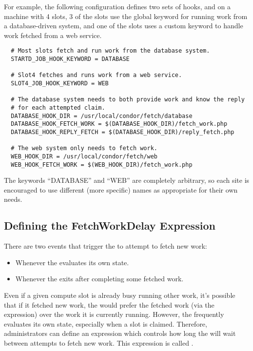 For example, the following configuration defines two sets of hooks,
and on a machine with 4 slots, 3 of the slots use the global keyword
for running work from a database-driven system, and one of the slots
uses a custom keyword to handle work fetched from a web service.
\begin{verbatim}
  # Most slots fetch and run work from the database system.
  STARTD_JOB_HOOK_KEYWORD = DATABASE

  # Slot4 fetches and runs work from a web service.
  SLOT4_JOB_HOOK_KEYWORD = WEB

  # The database system needs to both provide work and know the reply
  # for each attempted claim.
  DATABASE_HOOK_DIR = /usr/local/condor/fetch/database
  DATABASE_HOOK_FETCH_WORK = $(DATABASE_HOOK_DIR)/fetch_work.php
  DATABASE_HOOK_REPLY_FETCH = $(DATABASE_HOOK_DIR)/reply_fetch.php

  # The web system only needs to fetch work.
  WEB_HOOK_DIR = /usr/local/condor/fetch/web
  WEB_HOOK_FETCH_WORK = $(WEB_HOOK_DIR)/fetch_work.php
\end{verbatim}

The keywords ``DATABASE'' and ``WEB'' are completely arbitrary, so
each site is encouraged to use different (more specific) names as
appropriate for their own needs.


\subsection{\label{sec:job-hooks-fetch-work-delay}
Defining the FetchWorkDelay Expression}

There are two events that trigger the  to attempt to
fetch new work:
\begin{itemize}
\item Whenever the  evaluates its own state.
\item Whenever the  exits after completing some
  fetched work.
\end{itemize}

Even if a given compute slot is already busy running other work, it's
possible that if it fetched new work, the  would prefer
the fetched work (via the  expression) over the work it
is currently running.
However, the  frequently evaluates its own state,
especially when a slot is claimed.
Therefore, administrators can define an expression which controls how
long the  will wait between attempts to fetch new work.
This expression is called .

